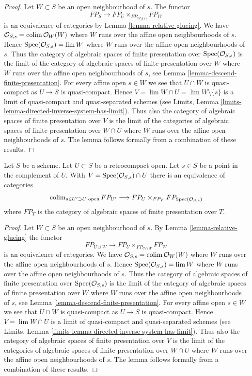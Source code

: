 \begin{proof}
Let $W \subset S$ be an open neighbourhood of $s$. The functor
$$
FP_S \to FP_U \times_{FP_{W \setminus \{s\}}} FP_W
$$
is an equivalence of categories by Lemma \ref{lemma-relative-glueing}.
We have $\mathcal{O}_{S, s} = \mathop{\mathrm{colim}}\nolimits \mathcal{O}_W(W)$ where
$W$ runs over the affine open neighbourhoods of $s$.
Hence $\mathop{\mathrm{Spec}}(\mathcal{O}_{S, s}) = \mathop{\mathrm{lim}}\nolimits W$ where $W$
runs over the affine open neighbourhoods of $s$.
Thus the category of algebraic spaces of finite presentation
over $\mathop{\mathrm{Spec}}(\mathcal{O}_{S, s})$ is the limit of the
category of algebraic spaces of finite presentation over
$W$ where $W$ runs over the affine open neighbourhoods
of $s$, see
Lemma \ref{lemma-descend-finite-presentation}.
For every affine open $s \in W$ we see that $U \cap W$
is quasi-compact as $U \to S$ is quasi-compact.
Hence $V = \lim W \cap U = \lim W \setminus \{s\}$ is a limit of
quasi-compact and quasi-separated schemes (see
Limits, Lemma \ref{limits-lemma-directed-inverse-system-has-limit}).
Thus also the category of algebraic spaces of finite presentation
over $V$ is the limit of the
categories of algebraic spaces of finite presentation over
$W \cap U$ where $W$ runs over the affine open neighbourhoods
of $s$. The lemma follows formally from a combination
of these results.
\end{proof}

\begin{lemma}
\label{lemma-glueing-near-point}
Let $S$ be a scheme. Let $U \subset S$ be a retrocompact open.
Let $s \in S$ be a point in the complement of $U$. With
$V = \mathop{\mathrm{Spec}}(\mathcal{O}_{S, s}) \cap U$ there is
an equivalence of categories
$$
\mathop{\mathrm{colim}}\nolimits_{s \in U' \supset U\text{ open}} FP_{U'}
\longrightarrow
FP_U \times_{FP_V} FP_{\mathop{\mathrm{Spec}}(\mathcal{O}_{S, s})}
$$
where $FP_T$  is the category of algebraic spaces of finite presentation
over $T$.
\end{lemma}

\begin{proof}
Let $W \subset S$ be an open neighbourhood of $s$. By
Lemma \ref{lemma-relative-glueing} the functor
$$
FP_{U \cup W}
\longrightarrow
FP_U \times_{FP_{U \cap W}} FP_W
$$
is an equivalence of categories. We have
$\mathcal{O}_{S, s} = \mathop{\mathrm{colim}}\nolimits \mathcal{O}_W(W)$ where
$W$ runs over the affine open neighbourhoods of $s$.
Hence $\mathop{\mathrm{Spec}}(\mathcal{O}_{S, s}) = \mathop{\mathrm{lim}}\nolimits W$ where $W$
runs over the affine open neighbourhoods of $s$.
Thus the category of algebraic spaces of finite presentation
over $\mathop{\mathrm{Spec}}(\mathcal{O}_{S, s})$ is the limit of the
category of algebraic spaces of finite presentation over
$W$ where $W$ runs over the affine open neighbourhoods
of $s$, see
Lemma \ref{lemma-descend-finite-presentation}.
For every affine open $s \in W$ we see that $U \cap W$
is quasi-compact as $U \to S$ is quasi-compact.
Hence $V = \lim W \cap U$ is a limit of
quasi-compact and quasi-separated schemes (see
Limits, Lemma \ref{limits-lemma-directed-inverse-system-has-limit}).
Thus also the category of algebraic spaces of finite presentation
over $V$ is the limit of the
categories of algebraic spaces of finite presentation over
$W \cap U$ where $W$ runs over the affine open neighbourhoods
of $s$. The lemma follows formally from a combination
of these results.
\end{proof}

